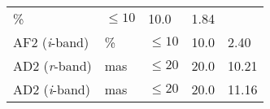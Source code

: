\documentclass[DM,toc]{lsstdoc}
\begin{document}
\begin{longtable}[]{@{}lllll@{}}
\begin{minipage}[t]{0.08\columnwidth}
\%\strut
\end{minipage} & \begin{minipage}[t]{0.20\columnwidth}\raggedright\strut
\(\leq 10\)\strut
\end{minipage} & \begin{minipage}[t]{0.22\columnwidth}\raggedright\strut
10.0\strut
\end{minipage} & \begin{minipage}[t]{0.17\columnwidth}\raggedright\strut
1.84\strut
\end{minipage}\tabularnewline
\begin{minipage}[t]{0.19\columnwidth}\raggedright\strut
AF2 (\emph{i}-band)\strut
\end{minipage} & \begin{minipage}[t]{0.08\columnwidth}\raggedright\strut
\%\strut
\end{minipage} & \begin{minipage}[t]{0.20\columnwidth}\raggedright\strut
\(\leq 10\)\strut
\end{minipage} & \begin{minipage}[t]{0.22\columnwidth}\raggedright\strut
10.0\strut
\end{minipage} & \begin{minipage}[t]{0.17\columnwidth}\raggedright\strut
2.40\strut
\end{minipage}\tabularnewline
\begin{minipage}[t]{0.19\columnwidth}\raggedright\strut
AD2 (\emph{r}-band)\strut
\end{minipage} & \begin{minipage}[t]{0.08\columnwidth}\raggedright\strut
mas\strut
\end{minipage} & \begin{minipage}[t]{0.20\columnwidth}\raggedright\strut
\(\leq 20\)\strut
\end{minipage} & \begin{minipage}[t]{0.22\columnwidth}\raggedright\strut
20.0\strut
\end{minipage} & \begin{minipage}[t]{0.17\columnwidth}\raggedright\strut
10.21\strut
\end{minipage}\tabularnewline
\begin{minipage}[t]{0.19\columnwidth}\raggedright\strut
AD2 (\emph{i}-band)\strut
\end{minipage} & \begin{minipage}[t]{0.08\columnwidth}\raggedright\strut
mas\strut
\end{minipage} & \begin{minipage}[t]{0.20\columnwidth}\raggedright\strut
\(\leq 20\)\strut
\end{minipage} & \begin{minipage}[t]{0.22\columnwidth}\raggedright\strut
20.0\strut
\end{minipage} & \begin{minipage}[t]{0.17\columnwidth}\raggedright\strut
11.16\strut
\end{minipage}\tabularnewline
\bottomrule
\end{longtable}
\end{document}
